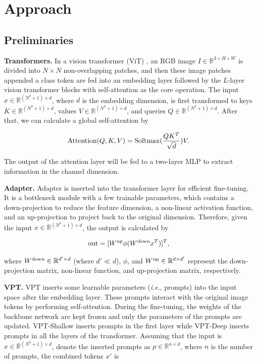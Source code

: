 \section{Approach}\label{sec: 3}

\subsection{Preliminaries}\label{sec: 3.1}

\textbf{Transformers.} In a vision transformer (ViT) \cite{dosovitskiy2020image}, an RGB image $I \in \mathbb{R}^{3 \times H \times W}$ is divided into $N \times N$ non-overlapping patches, and then these image patches appended a class token are fed into an embedding layer followed by the $L$-layer vision transformer blocks with self-attention as the core operation. The input $x \in \mathbb{R}^{(N^2 + 1) \times d}$, where $d$ is the embedding dimension, is first transformed to keys $K \in \mathbb{R}^{(N^2 + 1) \times d}$, values $V \in \mathbb{R}^{(N^2 + 1) \times d}$, and queries $Q \in \mathbb{R}^{(N^2 + 1) \times d}$. After that, we can calculate a global self-attention by

\begin{equation}\label{eq: attention}
	{\rm Attention}(Q, K, V) = {\rm Softmax} (\frac{QK^T}{\sqrt{d}})V.
\end{equation}

The output of the attention layer will be fed to a two-layer MLP to extract information in the channel dimension.

\textbf{Adapter.} Adapter \cite{houlsby2019parameter} is inserted into the transformer layer for efficient fine-tuning. It is a bottleneck module with a few trainable parameters, which contains a down-projection to reduce the feature dimension, a non-linear activation function, and an up-projection to project back to the original dimension. Therefore, given the input $x \in \mathbb{R}^{(N^2 + 1) \times d}$, the output is calculated by

\begin{equation}\label{eq: adapter}
	{\rm out} = [W^{\rm up} \phi (W^{\rm down} x^T)]^T,
\end{equation}

where $W^{\rm down} \in \mathbb{R}^{d' \times d}$ (where $d' \ll d$), $\phi$, and $W^{\rm up} \in \mathbb{R}^{d \times d'}$ represent the down-projection matrix, non-linear function, and up-projection matrix, respectively. 

\textbf{VPT.} VPT \cite{jia2022visual} inserts some learnable parameters (\emph{i.e.}, prompts) into the input space after the embedding layer. These prompts interact with the original image tokens by performing self-attention. During the fine-tuning, the weights of the backbone network are kept frozen and only the parameters of the prompts are updated. VPT-Shallow inserts prompts in the first layer while VPT-Deep inserts prompts in all the layers of the transformer. Assuming that the input is $x \in \mathbb{R}^{(N^2 + 1) \times d}$, denote the inserted prompts as $p \in \mathbb{R}^{n \times d}$, where $n$ is the number of prompts, the combined tokens $x'$ is

